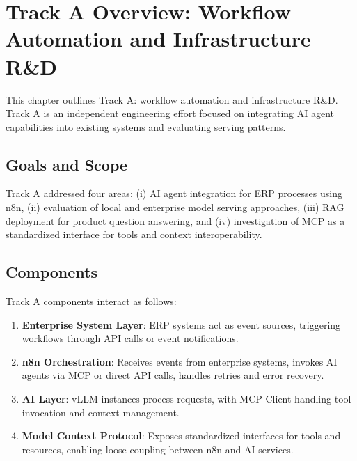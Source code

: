 \chapter{Track A Overview: Workflow Automation and Infrastructure R\&D}
\label{ch:TrackAOverview}

This chapter outlines Track A: workflow automation and infrastructure R\&D. Track A is an independent engineering effort focused on integrating AI agent capabilities into existing systems and evaluating serving patterns.

\section{Goals and Scope}
\label{sec:TrackA_Goals}

Track A addressed four areas: (i) AI agent integration for ERP processes using n8n, (ii) evaluation of local and enterprise model serving approaches, (iii) RAG deployment for product question answering, and (iv) investigation of MCP as a standardized interface for tools and context interoperability.

\section{Components}
\label{sec:TrackA_Components}

Track A components interact as follows:

\begin{enumerate}
      \item \textbf{Enterprise System Layer}: ERP systems act as event sources, triggering workflows through API calls or event notifications.
      \item \textbf{n8n Orchestration}: Receives events from enterprise systems, invokes AI agents via MCP or direct API calls, handles retries and error recovery.
      \item \textbf{AI Layer}: vLLM instances process requests, with MCP Client handling tool invocation and context management.
      \item \textbf{Model Context Protocol}: Exposes standardized interfaces for tools and resources, enabling loose coupling between n8n and AI services.
\end{enumerate}

